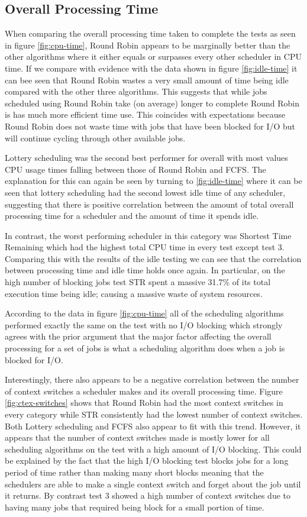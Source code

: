 \documentclass{acm_proc_article-sp}
\begin{document}
\subsection{Overall Processing Time}
When comparing the overall processing time taken to complete the tests as seen in figure \ref{fig:cpu-time}, Round Robin appears to be marginally better than the other algorithms where it either equals or surpasses every other scheduler in CPU time. If we compare with evidence with the data shown in figure \ref{fig:idle-time} it can bee seen that Round Robin wastes a very small amount of time being idle compared with the other three algorithms. This suggests that while jobs scheduled using Round Robin take (on average) longer to complete Round Robin is has much more efficient time use. This coincides with expectations because Round Robin does not waste time with jobs that have been blocked for I/O but will continue cycling through other available jobs.

Lottery scheduling was the second best performer for overall with most values CPU usage times falling between those of Round Robin and FCFS. The explanation for this can again be seen by turning to \ref{fig:idle-time} where it can be seen that lottery scheduling had the second lowest idle time of any scheduler, suggesting that there is positive correlation between the amount of total overall processing time for a scheduler and the amount of time it spends idle.

In contrast, the worst performing scheduler in this category was Shortest Time Remaining which had the highest total CPU time in every test except test 3. Comparing this with the results of the idle testing we can see that the correlation between processing time and idle time holds once again. In particular, on the high number of blocking jobs test STR spent a massive 31.7\% of its total execution time being idle; causing a massive waste of system resources.

According to the data in figure \ref{fig:cpu-time} all of the scheduling algorithms performed exactly the same on the test with no I/O blocking which strongly agrees with the prior argument that the major factor affecting the overall processing for a set of jobs is what a scheduling algorithm does when a job is blocked for I/O.

Interestingly, there also appears to be a negative correlation between the number of context switches a scheduler makes and its overall processing time. Figure \ref{fig:ctex-switches} shows that Round Robin had the most context switches in every category while STR consistently had the lowest number of context switches. Both Lottery scheduling and FCFS also appear to fit with this trend. However, it appears that the number of context switches made is mostly lower for all scheduling algorithms on the test with a high amount of I/O blocking. This could be explained by the fact that the high I/O blocking test blocks jobs for a long period of time rather than making many short blocks meaning that the schedulers are able to make a single context switch and forget about the job until it returns. By contrast test 3 showed a high number of context switches due to having many jobs that required being block for a small portion of time.
\end{document}
